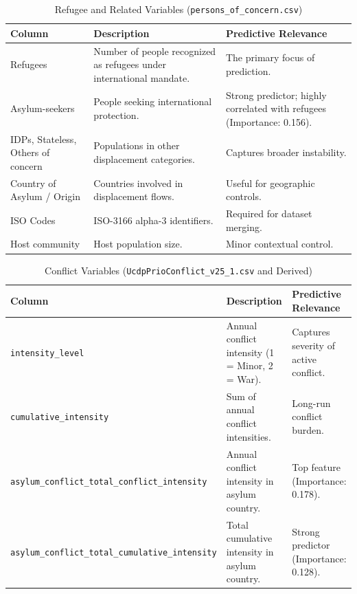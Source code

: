 \documentclass{article}
\theoremstyle{plain}
\theoremstyle{definition}
\theoremstyle{remark}
\begin{document}
\begin{table}[!htbp]
\caption{Refugee and Related Variables (\texttt{persons\_of\_concern.csv})}
\label{tab:data_dict_refugee}
\centering
\begin{scriptsize}
\renewcommand{\arraystretch}{1.25}
\begin{tabularx}{\columnwidth}{|X|X|X|}
\hline
\textbf{Column} & \textbf{Description} & \textbf{Predictive Relevance} \\
\hline
Refugees & Number of people recognized as refugees under international mandate. & The primary focus of prediction. \\
\hline
Asylum-seekers & People seeking international protection. & Strong predictor; highly correlated with refugees (Importance: 0.156). \\
\hline
IDPs, Stateless, Others of concern & Populations in other displacement categories. & Captures broader instability. \\
\hline
Country of Asylum / Origin & Countries involved in displacement flows. & Useful for geographic controls. \\
\hline
ISO Codes & ISO-3166 alpha-3 identifiers. & Required for dataset merging. \\
\hline
Host community & Host population size. & Minor contextual control. \\
\hline
\end{tabularx}
\end{scriptsize}
\end{table}


\begin{table}[!htbp]
\caption{Conflict Variables (\texttt{UcdpPrioConflict\_v25\_1.csv} and Derived)}
\label{tab:data_dict_conflict}
\centering
\begin{scriptsize}
\renewcommand{\arraystretch}{1.25}
\begin{tabularx}{\columnwidth}{|X|X|X|}
\hline
\textbf{Column} & \textbf{Description} & \textbf{Predictive Relevance} \\
\hline
\texttt{intensity\_\allowbreak level} 
& Annual conflict intensity (1 = Minor, 2 = War). 
& Captures severity of active conflict. \\
\hline
\texttt{cumulative\_\allowbreak intensity} 
& Sum of annual conflict intensities. 
& Long-run conflict burden. \\
\hline
\texttt{asylum\_\allowbreak conflict\_\allowbreak total\_\allowbreak conflict\_\allowbreak intensity} 
& Annual conflict intensity in asylum country. 
& Top feature (Importance: 0.178). \\
\hline
\texttt{asylum\_\allowbreak conflict\_\allowbreak total\_\allowbreak cumulative\_\allowbreak intensity} 
& Total cumulative intensity in asylum country. 
& Strong predictor (Importance: 0.128). \\
\hline
\end{tabularx}
\end{scriptsize}
\end{table}
\end{document}

